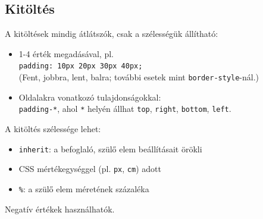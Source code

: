 \subsection{Kitöltés}

\begin{frame}
  A kitöltések mindig átlátszók, csak a szélességük állítható:
  \begin{itemize}
    \item 1-4 érték megadásával, pl.\\
    \texttt{padding: 10px 20px 30px 40px;}\\
    (Fent, jobbra, lent, balra; további esetek mint \texttt{border-style}-nál.)
    \item Oldalakra vonatkozó tulajdonságokkal:\\
      \texttt{padding-*}, ahol \texttt{*} helyén állhat 
      \texttt{top}, \texttt{right}, \texttt{bottom}, \texttt{left}.
  \end{itemize}
\end{frame}

\begin{frame}
  A kitöltés szélessége lehet:
  \begin{itemize}
    \item \texttt{inherit}: a befoglaló, szülő elem beállításait örökli
    \item CSS mértékegységgel (pl. \texttt{px}, \texttt{cm}) adott
    \item \texttt{\%}: a szülő elem méretének százaléka
  \end{itemize}
  \vfill
  Negatív értékek  használhatók.
\end{frame}

